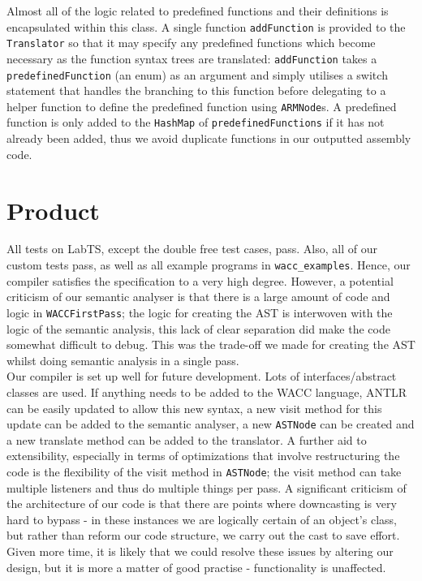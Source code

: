 \documentclass[a4wide, 10pt]{article}
\begin{document}
Almost all of the logic related to predefined functions and their definitions is encapsulated within this class. A single function \texttt{addFunction} is provided to the \texttt{Translator} so that it may specify any predefined functions which become necessary as the function syntax trees are translated:  \texttt{addFunction} takes a \texttt{predefinedFunction} (an enum) as an argument and simply utilises a switch statement that handles the branching to this function before delegating to a helper function to define the predefined function using \texttt{ARMNode}s. A predefined function is only added to the \texttt{HashMap} of \texttt{predefinedFunctions} if it has not already been added, thus we avoid duplicate functions in our outputted assembly code.

\section*{Product}
All tests on LabTS, except the double free test cases, pass. Also, all of our custom tests pass, as well as all example programs in \texttt{wacc\_examples}. Hence, our compiler satisfies the specification to a very high degree. However, a potential criticism of our semantic analyser is that there is a large amount of code and logic in \texttt{WACCFirstPass}; the logic for creating the AST is interwoven with the logic of the semantic analysis, this lack of clear separation did make the code somewhat difficult to debug. This was the trade-off we made for creating the AST whilst doing semantic analysis in a single pass.\\
\indent Our compiler is set up well for future development. Lots of interfaces/abstract classes are used. If anything needs to be added to the WACC language, ANTLR can be easily updated to allow this new syntax, a new visit method for this update can be added to the semantic analyser, a new \texttt{ASTNode} can be created and a new translate method can be added to the translator. A further aid to extensibility, especially in terms of optimizations that involve restructuring the code is the flexibility of the visit method in \texttt{ASTNode}; the visit method can take multiple listeners and thus do multiple things per pass. A significant criticism of the architecture of our code is that there are points where downcasting is very hard to bypass - in these instances we are logically certain of an object's class, but rather than reform our code structure, we carry out the cast to save effort. Given more time, it is likely that we could resolve these issues by altering our design, but it is more a matter of good practise - functionality is unaffected.
\end{document}
